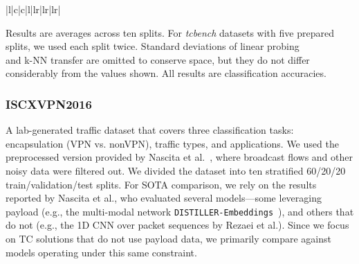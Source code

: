 \documentclass[lettersize,journal,twoside,article]{IEEEtran}
\begin{document}
\begin{table}[!ht]
\begin{threeparttable}
\begin{NiceTabular}{|l|c|c|l|lr|lr|lr|}
\end{NiceTabular}

\begin{tablenotes}
\leftskip=0.3cm

\item Results are averages across ten splits. For \textit{tcbench} datasets with five prepared splits, we used each split twice. Standard deviations of linear probing \\\;and k-NN transfer are omitted to conserve space, but they do not differ considerably from the values shown. All results are classification accuracies.

\end{tablenotes}
\end{threeparttable}

\end{table}

\subsubsection*{ISCXVPN2016}
A lab-generated traffic dataset that covers three classification tasks: encapsulation (VPN vs. nonVPN), traffic types, and applications. We used the preprocessed version provided by Nascita et al.~\cite{Nascita2023Embeddings}, where broadcast flows and other noisy data were filtered out. We divided the dataset into ten stratified 60/20/20 train/validation/test splits. For SOTA comparison, we rely on the results reported by Nascita et al., who evaluated several models---some leveraging payload (e.g., the multi-modal network \texttt{DISTILLER-Embeddings}~\cite{Nascita2023Embeddings}), and others that do not (e.g., the 1D CNN over packet sequences by Rezaei et al.\cite{Rezaei2020Multitask}). Since we focus on TC solutions that do not use payload data, we primarily compare against models operating under this same constraint. 
\end{document}

